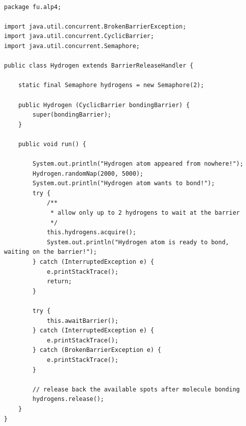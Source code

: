 \begin{lstlisting}[style=java]

package fu.alp4;

import java.util.concurrent.BrokenBarrierException;
import java.util.concurrent.CyclicBarrier;
import java.util.concurrent.Semaphore;

public class Hydrogen extends BarrierReleaseHandler {

    static final Semaphore hydrogens = new Semaphore(2);

    public Hydrogen (CyclicBarrier bondingBarrier) {
        super(bondingBarrier);
    }

    public void run() {

        System.out.println("Hydrogen atom appeared from nowhere!");
        Hydrogen.randomNap(2000, 5000);
        System.out.println("Hydrogen atom wants to bond!");
        try {
            /**
             * allow only up to 2 hydrogens to wait at the barrier
             */
            this.hydrogens.acquire();
            System.out.println("Hydrogen atom is ready to bond, waiting on the barrier!");
        } catch (InterruptedException e) {
            e.printStackTrace();
            return;
        }

        try {
            this.awaitBarrier();
        } catch (InterruptedException e) {
            e.printStackTrace();
        } catch (BrokenBarrierException e) {
            e.printStackTrace();
        }

        // release back the available spots after molecule bonding
        hydrogens.release();
    }
}

\end{lstlisting}


